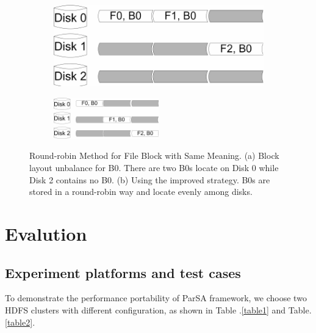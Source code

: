 \documentclass[preprint,12pt]{elsarticle}
\begin{document}
\begin{figure}[htb]
    \centering
    \begin{subfigure}{0.5\textwidth}
        \includegraphics[width=\textwidth]{figure7a}
        \caption{}
        \label{figure7a}
    \end{subfigure}

    \begin{subfigure}{\textwidth}
        \centering
        \includegraphics[width=0.5\textwidth]{figure7b}%
        \caption{}
        \label{figure7b}
    \end{subfigure}
    \caption{Round-robin Method for File Block with Same Meaning. (a) Block layout unbalance for B0. There are two B0s locate on Disk 0
             while Disk 2 contains no B0. (b) Using the improved strategy. B0s are stored in a round-robin way and locate evenly among 
             disks.}
    \label{figure7}
\end{figure}

\section{Evalution}

\subsection{Experiment platforms and test cases}
To demonstrate the performance portability of ParSA framework, we choose two HDFS clusters with different configuration, as shown in Table
.\ref{table1} and Table.\ref{table2}. \par
\end{document}

